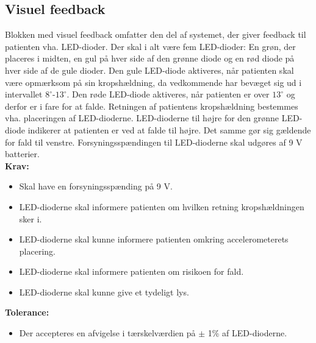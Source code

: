 \subsection{Visuel feedback}
Blokken med visuel feedback omfatter den del af systemet, der giver feedback til patienten vha. LED-dioder. Der skal i alt være fem LED-dioder: En grøn, der placeres i midten, en gul på hver side af den grønne diode og en rød diode på hver side af de gule dioder. Den gule LED-diode aktiveres, når patienten skal være opmærksom på sin kropshældning, da vedkommende har bevæget sig ud i intervallet $8^{\circ}$-$13^{\circ}$. Den røde LED-diode aktiveres, når patienten er over $13^{\circ}$ og derfor er i fare for at falde. Retningen af patientens kropshældning bestemmes vha. placeringen af LED-dioderne. LED-dioderne til højre for den grønne LED-diode indikerer at patienten er ved at falde til højre. Det samme gør sig gældende for fald til venstre. Forsyningsspændingen til LED-dioderne skal udgøres af 9 V batterier.   
\\
\textbf{Krav:}
\begin{itemize}
\item Skal have en forsyningsspænding på 9 V.
\item LED-dioderne skal informere patienten om hvilken retning kropshældningen sker i.
\item LED-dioderne skal kunne informere patienten omkring accelerometerets placering.
\item LED-dioderne skal informere patienten om risikoen for fald.
\item LED-dioderne skal kunne give et tydeligt lys.
\end{itemize}
\textbf{Tolerance:}
\begin{itemize}
\item Der accepteres en afvigelse i tærskelværdien på $\pm$ 1\% af LED-dioderne.
\end{itemize}
